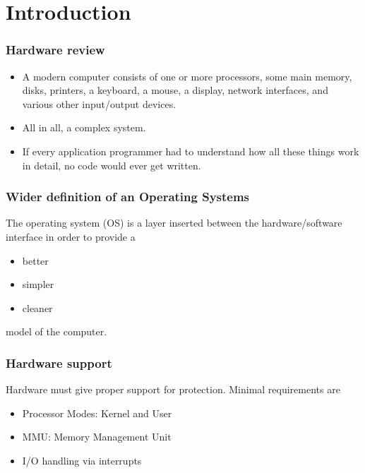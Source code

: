 \section{Introduction}

\begin{frame}
    \frametitle{Hardware review}
    
    \begin{itemize}
        \item 
        A modern  computer  consists  of  one  or  more
        processors, some main  memory, disks,  printers,  
        a  keyboard,  a  mouse, a  display,  
        network  interfaces,  and  various other 
        input/output devices.

        \item 
        All in all, a complex system.
        
        \item 
        If every application programmer had to understand
        how all these things work in detail,
        no code would ever get written.

    \end{itemize}    

\end{frame}

\begin{frame}
    \frametitle{Wider definition of an Operating Systems}
    
    The operating system (OS) is a layer inserted 
    between the hardware/software interface in order
    to provide a 
    \begin{itemize}
        \item better
        \item simpler
        \item cleaner
    \end{itemize} 
    model of the computer.

\end{frame}

\begin{frame}
    \frametitle{Hardware support}
    
    Hardware must give proper support for protection.
    Minimal requirements are
    \begin{itemize}
        \item Processor Modes: Kernel and User
        \item MMU: Memory Management Unit
        \item I/O handling via interrupts
    \end{itemize}

\end{frame}


